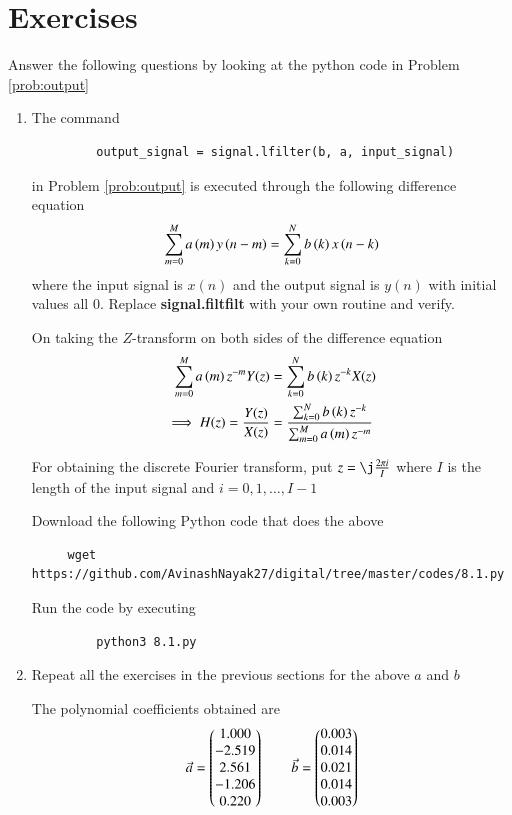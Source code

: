 \documentclass[journal,12pt,twocolumn]{IEEEtran}
\renewcommand\thesection{\arabic{section}}
\begin{document}
     \section{Exercises}
     Answer the following questions by looking at the python code in Problem \ref{prob:output}
     \begin{enumerate}[label=\thesection.\arabic*]
       \item The command
       \begin{lstlisting}
         output_signal = signal.lfilter(b, a, input_signal)
       \end{lstlisting}
       in Problem \ref{prob:output} is executed through the following difference equation
       \begin{equation}
         \label{eq:iir_filter_gen}
         \sum _{m=0}^{M}a\left(m\right)y\left(n-m\right)=\sum _{k=0}^{N}b\left(k\right)x\left(n-k\right)
       \end{equation}
       where the input signal is $x(n)$ and the output signal is $y(n)$ with initial values all 0. Replace \textbf{signal.filtfilt} with your own routine and verify.
       
       \solution On taking the $Z$-transform on both sides of the difference equation
       \begin{align}
         \sum _{m=0}^{M}a\left(m\right) z^{-m} Y(z) &= \sum _{k=0}^{N}b\left(k\right) z^{-k} X(z) \\
         \implies H(z) = \frac{Y(z)}{X(z)} &= \frac{\sum _{k=0}^{N}b\left(k\right) z^{-k}}{\sum _{m=0}^{M}a\left(m\right) z^{-m}}
       \end{align}
       
       For obtaining the discrete Fourier transform, put $z = \j \frac{2\pi i}{I}$ where $I$ is the length of the input signal and $i = 0, 1, \ldots, I-1$
       
       Download the following Python code that does the above
       \begin{lstlisting}
     wget https://github.com/AvinashNayak27/digital/tree/master/codes/8.1.py
      \end{lstlisting}
       Run the code by executing
       \begin{lstlisting}
         python3 8.1.py
       \end{lstlisting}
       
       \item Repeat all the exercises in the previous sections for the above $a$ and $b$
       
       \solution The polynomial coefficients obtained are
       \begin{align}
         \vec{a} = \begin{pmatrix}1.000 \\ -2.519 \\ 2.561 \\ -1.206 \\ 0.220\end{pmatrix} \qquad
         \vec{b} = \begin{pmatrix}0.003 \\ 0.014 \\ 0.021 \\ 0.014 \\ 0.003\end{pmatrix}
       \end{align}
       

\end{enumerate}
\end{document}
